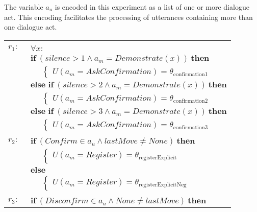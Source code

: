 The variable $a_u$ is encoded in this experiment as a list of one or more dialogue act.  This encoding facilitates the processing of utterances containing more than one dialogue act.  
\begin{small}
\begin{longtable}{p{3cm}l} \hdashline \\[-3mm]
$r_{1}: \ \ $ &  $\forall x : $ \\ & $\textbf{if} \ (\mathit{silence}\!>\!\mathit{1} \land \mathit{a_m}\!=\!\mathit{Demonstrate}(x)) \ \textbf{then}$ \\
& $\;\;\;\;\; \begin{cases}U(\mathit{a_m}\!=\!\mathit{AskConfirmation})\!=\!\theta_{\mathrm{confirmation1}}\end{cases}$ \\ 
& $\textbf{else if} \ (\mathit{silence}\!>\!\mathit{2} \land \mathit{a_m}\!=\!\mathit{Demonstrate}(x)) \ \textbf{then}$ \\
& $\;\;\;\;\; \begin{cases}U(\mathit{a_m}\!=\!\mathit{AskConfirmation})\!=\!\theta_{\mathrm{confirmation2}}\end{cases}$ \\ 
& $\textbf{else if} \ (\mathit{silence}\!>\!\mathit{3} \land \mathit{a_m}\!=\!\mathit{Demonstrate}(x)) \ \textbf{then}$ \\
& $\;\;\;\;\; \begin{cases}U(\mathit{a_m}\!=\!\mathit{AskConfirmation})\!=\!\theta_{\mathrm{confirmation3}}\end{cases}$ \\[3mm] \hdashline \\[-2mm]
$r_{2}: \ \ $ & $\textbf{if} \ (\mathit{Confirm}\!\in\!\mathit{a_u} \land \mathit{lastMove}\!\neq\!\mathit{None}) \ \textbf{then}$ \\
& $\;\;\;\;\; \begin{cases}U(\mathit{a_m}\!=\!\mathit{Register})\!=\!\theta_{\mathrm{registerExplicit}}\end{cases}$\\ 
& $\textbf{else}$ \\
& $\;\;\;\;\; \begin{cases}U(\mathit{a_m}\!=\!\mathit{Register})\!=\!\theta_{\mathrm{registerExplicitNeg}}\end{cases}$ \\[3mm] \hdashline \\[-2mm]
$r_{3}: \ \ $& $\textbf{if} \ (\mathit{Disconfirm}\!\in\!\mathit{a_u} \land \mathit{None}\!\neq\!\mathit{lastMove}) \ \textbf{then}$ \\

\end{longtable}
\end{small}
